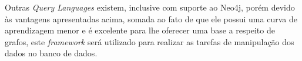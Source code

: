 \par Outras \textit{Query Languages} existem, inclusive com suporte ao Neo4j, porém devido às vantagens apresentadas acima, somada ao fato de que ele possui uma curva de aprendizagem menor e é excelente para lhe oferecer uma base a respeito de grafos,  este \textit{framework} será utilizado para realizar as tarefas de manipulação dos dados no banco de dados.
